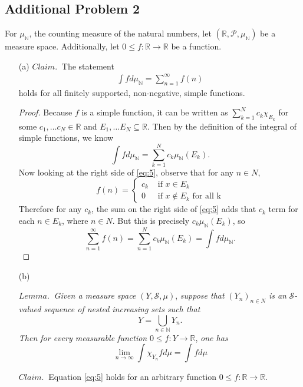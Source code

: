 \documentclass[12pt]{article}
\def\R{\mathbb{R}}
\def\N{\mathbb{N}}
\begin{document}
\subsection*{Additional Problem 2}

For $\mu_\N$, the counting measure of the natural numbers, let $(\R, \mathcal{P}, \mu_\N)$ be a measure space. Additionally, let $0 \leq f: \R \to \R$ be a function.

\begin{itemize}
    \item[(a)] $Claim.~$ The statement
    \begin{align}
        \int f d\mu_\N = \sum_{n = 1}^\infty f(n) \label{eq:5}
    \end{align}
    holds for all finitely supported, non-negative, simple functions.

    \begin{proof}
        Because $f$ is a simple function, it can be written as $\sum_{k=1}^N c_k \chi_{E_k}$ for some $c_1, \ldots c_N \in \R$ and $E_1, \ldots E_N \subseteq \R$. Then by the definition of the integral of simple functions, we know $$\int f d\mu_\N = \sum_{k=1}^N c_k \mu_\N (E_k).$$ Now looking at the right side of \eqref{eq:5}, observe that for any $n \in N$, $$f(n) = \begin{cases}
            c_k &\text{ if } x \in E_k \\
            0 &\text{ if } x \notin E_k \text{ for all k}
        \end{cases}$$
        Therefore for any $c_k$, the sum on the right side of \eqref{eq:5} adds that $c_k$ term for each $n \in E_k$, where $n \in N$. But this is precisely $c_k \mu_\N (E_k)$, so $$\sum_{n=1}^{\infty} f(n) = \sum_{n=1}^{N} c_k \mu_\N (E_k) = \int f d \mu_\N.$$
    \end{proof}

    \item[(b)]
    
    $Lemma.~$ \textit{Given a measure space} $(Y, \mathcal{S}, \mu)$, \textit{suppose that} $(Y_n)_{n \in N}$ \textit{is an} $\mathcal{S}$\textit{-valued sequence of nested increasing sets such that} $$Y = \bigcup_{n \in \N} Y_n.$$ \textit{Then for every measurable function} $0 \leq f : Y \to \R$, \textit{one has} $$\lim_{n \to \infty} \int \chi_{Y_n} f d\mu = \int f d \mu$$
    
    $Claim.~$ Equation \eqref{eq:5} holds for an arbitrary function $0 \leq f: \R \to \R$.


\end{itemize}
\end{document}
